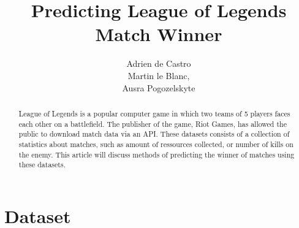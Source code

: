 \documentclass[a4paper,oneside,10pt]{article}
\begin{document}
\pagestyle{empty} %


\title{Predicting League of Legends Match Winner}
\author{Adrien de Castro\\
        Martin le Blanc, \\
        Ausra Pogozelskyte
        }

\maketitle
\begin{abstract}
League of Legends is a popular computer game in which two teams of 5 players faces each other on a battlefield. The publisher of the game, Riot Games, has allowed the public to download match data via an API. These datasets consists of a collection of statistics about matches, such as amount of ressources collected, or number of kills on the enemy. This article will discuss methods of predicting the winner of matches using these datasets.
\end{abstract}

\clearpage

\pagestyle{plain} %

\section{Dataset}
\end{document}
